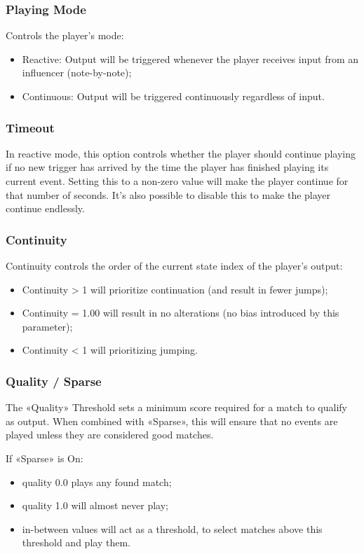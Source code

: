 \subsubsection{Playing Mode}
Controls the player's mode:
\begin{itemize}
    \item Reactive: Output will be triggered whenever the player receives input from an influencer (note-by-note);
    \item Continuous: Output will be triggered continuously regardless of input.
\end{itemize}

\subsubsection{Timeout}
In reactive mode, this option controls whether the player should continue playing if no new trigger has arrived by the time the player has finished playing its current event. 
Setting this to a non-zero value will make the player continue for that number of seconds. 
It's also possible to disable this to make the player continue endlessly.

\subsubsection{Continuity}
Continuity controls the order of the current state index of the player's output:
\begin{itemize}
    \item Continuity > 1 will prioritize continuation (and result in fewer jumps);
    \item Continuity = 1.00 will result in no alterations (no bias introduced by this parameter);
    \item Continuity < 1 will prioritizing jumping.
\end{itemize}

\subsubsection{Quality / Sparse}
The «Quality» Threshold sets a minimum score required for a match to qualify as output. 
When combined with «Sparse», this will ensure that no events are played unless they are considered good matches.

If «Sparse» is On:
\begin{itemize}
    \item quality 0.0 plays any found match;
    \item quality 1.0 will almost never play;
    \item in-between values will act as a threshold, to select matches above this threshold and play them.
\end{itemize}

